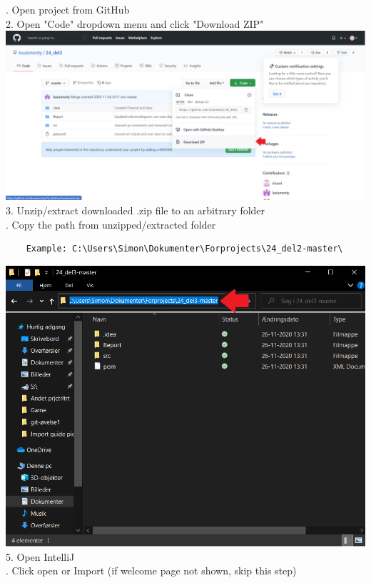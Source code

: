 
\begin{flushleft}
 . Open project from GitHub\\
    2. Open "Code" dropdown menu and click "Download ZIP"\\
    \vspace{5mm}
    \includegraphics[width=16.5cm]{Report/root/step1.1.png}\\
    3. Unzip/extract downloaded .zip file to an arbitrary folder\\
    . Copy the path from unzipped/extracted folder\\
    \begin{verbatim}
    Example: C:\Users\Simon\Dokumenter\Forprojects\24_del2-master\    
    \end{verbatim}
    \includegraphics[width=16.5cm]{Report/root/step2.1.png}\\
    5. Open IntelliJ\\
    . Click open or Import (if welcome page not shown, skip this step)\\

\end{flushleft}
